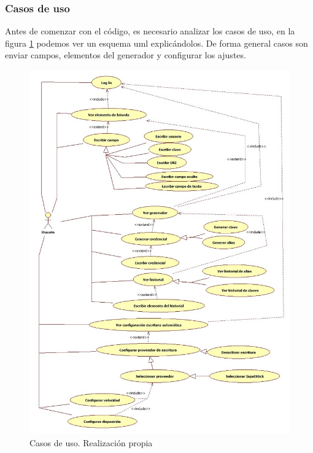 \subsubsection{Casos de uso}
Antes de comenzar con el código, es necesario analizar los casos de uso, en la figura \ref{fig:casos} podemos ver un esquema \gls{uml} explicándolos. De forma general casos son enviar campos, elementos del generador y configurar los ajustes.
\begin{figure}[H]
    \centering
    \includegraphics[height={0.935\textheight}]{gfx/casos.jpg}
    \caption{Casos de uso. Realización propia}
    \label{fig:casos}
\end{figure}


